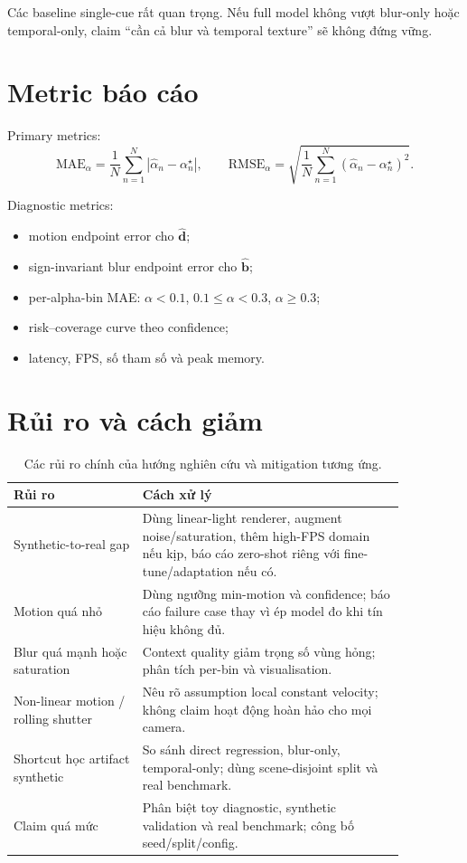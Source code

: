 \documentclass[11pt,a4paper]{article}
\newcommand{\vect}[1]{\mathbf{#1}}
\begin{document}
Các baseline single-cue rất quan trọng. Nếu full model không vượt blur-only hoặc temporal-only, claim ``cần cả blur và temporal texture'' sẽ không đứng vững.

\section{Metric báo cáo}

Primary metrics:
\[
    \mathrm{MAE}_\alpha =
    \frac{1}{N}\sum_{n=1}^N |\hat{\alpha}_n - \alpha_n^\star|,
    \qquad
    \mathrm{RMSE}_\alpha =
    \sqrt{
      \frac{1}{N}\sum_{n=1}^N
      (\hat{\alpha}_n - \alpha_n^\star)^2
    }.
\]

Diagnostic metrics:
\begin{itemize}[leftmargin=1.5em]
    \item motion endpoint error cho $\hat{\vect d}$;
    \item sign-invariant blur endpoint error cho $\hat{\vect b}$;
    \item per-alpha-bin MAE: $\alpha<0.1$, $0.1\le\alpha<0.3$, $\alpha\ge0.3$;
    \item risk--coverage curve theo confidence;
    \item latency, FPS, số tham số và peak memory.
\end{itemize}

\section{Rủi ro và cách giảm}

\begin{table}[h]
\centering
\small
\begin{tabular}{p{0.28\linewidth}p{0.58\linewidth}}
\toprule
\textbf{Rủi ro} & \textbf{Cách xử lý} \\
\midrule
Synthetic-to-real gap & Dùng linear-light renderer, augment noise/saturation, thêm high-FPS domain nếu kịp, báo cáo zero-shot riêng với fine-tune/adaptation nếu có. \\
Motion quá nhỏ & Dùng ngưỡng min-motion và confidence; báo cáo failure case thay vì ép model đo khi tín hiệu không đủ. \\
Blur quá mạnh hoặc saturation & Context quality giảm trọng số vùng hỏng; phân tích per-bin và visualisation. \\
Non-linear motion / rolling shutter & Nêu rõ assumption local constant velocity; không claim hoạt động hoàn hảo cho mọi camera. \\
Shortcut học artifact synthetic & So sánh direct regression, blur-only, temporal-only; dùng scene-disjoint split và real benchmark. \\
Claim quá mức & Phân biệt toy diagnostic, synthetic validation và real benchmark; công bố seed/split/config. \\
\bottomrule
\end{tabular}
\caption{Các rủi ro chính của hướng nghiên cứu và mitigation tương ứng.}
\end{table}
\end{document}
